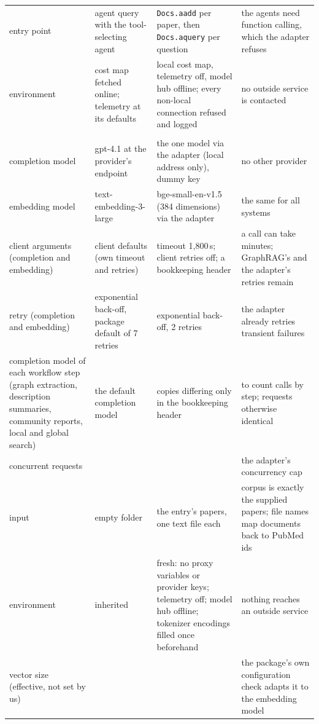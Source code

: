 \documentclass{article} %
\begin{document}
\begin{table}[!htbp]
\begin{tabularx}{\linewidth}{>{\raggedright\arraybackslash}p{2.9cm}>{\raggedright\arraybackslash}p{2.9cm}>{\raggedright\arraybackslash}p{3.2cm}>{\raggedright\arraybackslash}X}
entry point & agent query with the tool-selecting agent & \texttt{Docs.aadd} per paper, then \texttt{Docs.aquery} per question & the agents need function calling, which the adapter refuses \\
environment & cost map fetched online; telemetry at its defaults & local cost map, telemetry off, model hub offline; every non-local connection refused and logged & no outside service is contacted \\
\multicolumn{4}{l}{\emph{GraphRAG (graphrag 3.3.0)}} \\
completion model & gpt-4.1 at the provider's endpoint & the one model via the adapter (local address only), dummy key & no other provider \\
embedding model & text-embedding-3-large & bge-small-en-v1.5 (384 dimensions) via the adapter & the same for all systems \\
client arguments (completion and embedding) & client defaults (own timeout and retries) & timeout 1,800\,s; client retries off; a bookkeeping header & a call can take minutes; GraphRAG's and the adapter's retries remain \\
retry (completion and embedding) & exponential back-off, package default of 7 retries & exponential back-off, 2 retries & the adapter already retries transient failures \\
completion model of each workflow step (graph extraction, description summaries, community reports, local and global search) & the default completion model & copies differing only in the bookkeeping header & to count calls by step; requests otherwise identical \\
concurrent requests & 25 & 3 & the adapter's concurrency cap \\
input & empty folder & the entry's papers, one text file each & corpus is exactly the supplied papers; file names map documents back to PubMed ids \\
environment & inherited & fresh: no proxy variables or provider keys; telemetry off; model hub offline; tokenizer encodings filled once beforehand & nothing reaches an outside service \\
vector size (effective, not set by us) & 3072 & 384 & the package's own configuration check adapts it to the embedding model \\
\bottomrule
\end{tabularx}
\end{table}
\end{document}
